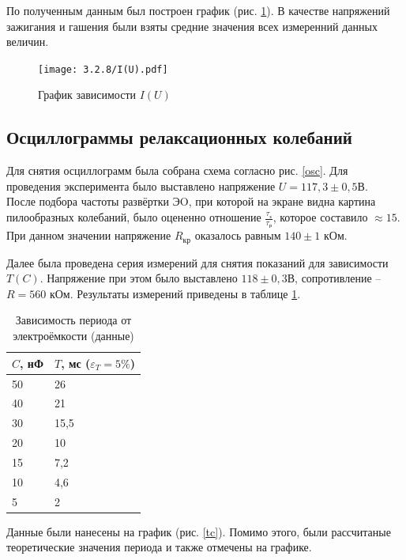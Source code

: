 \documentclass[a4paper,12pt]{article} %
\begin{document}
По полученным данным был построен график (рис. \ref{iu}). В качестве напряжений зажигания и гашения были взяты средние значения всех измеренний данных величин.

\begin{figure}[h]
    \centering
    \texttt{[image: 3.2.8/I(U).pdf]}
    \caption{График зависимости $I(U)$}
    \label{iu}
\end{figure}


\subsection{Осциллограммы релаксационных колебаний}

Для снятия осциллограмм была собрана схема согласно рис. \ref{osc}.
Для проведения эксперимента было выставлено напряжение $U = 117,3 \pm 0,5 $В.\\
После подбора частоты развёртки ЭO, при которой на экране видна картина пилообразных колебаний, было оцененно отношение $\displaystyle \frac{\tau_\text{з}}{\tau_\text{р}}$, которое составило $\approx 15$.\\

При данном значении напряжение $R_\text{кр}$ оказалось равным $140 \pm 1$ кОм. 

Далее была проведена серия измерений для снятия показаний для зависимости $T(C)$. Напряжение при этом было выставлено $118 \pm 0,3 $В, сопротивление -- $R = 560$ кОм. Результаты измерений приведены в таблице \ref{tec}.


\begin{table}[h]
    \centering
    \begin{tabular}{|p{3.5cm}|p{3.5cm}|}
    \hline        $C$, нФ & $T$, мс ($\varepsilon_T = 5\%$) \\ \hline
        50 & 26   \\ \hline
        40 & 21   \\ \hline
        30 & 15,5 \\ \hline
        20 & 10   \\ \hline
        15 & 7,2  \\ \hline
        10 & 4,6  \\ \hline
        5  & 2    \\ \hline 
    \end{tabular}
    \caption{Зависимость периода от электроёмкости (данные)}
    \label{tec}
\end{table}

Данные были нанесены на график (рис. \ref{tc}). Помимо этого, были рассчитаные теоретические значения периода и также отмечены на графике.
\end{document}
